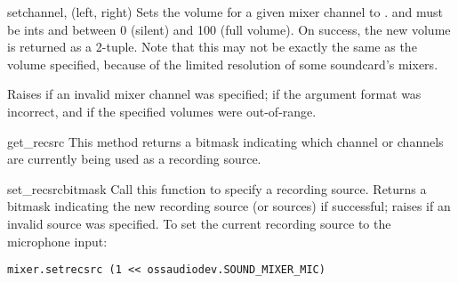 \begin{methoddesc}{set}{channel, (left, right)}
Sets the volume for a given mixer channel to .
 and  must be ints and between 0 (silent) and 100
(full volume).  On success, the new volume is returned as a 2-tuple.
Note that this may not be exactly the same as the volume specified,
because of the limited resolution of some soundcard's mixers.

Raises  if an invalid mixer channel was specified;
 if the argument format was incorrect, and
 if the specified volumes were out-of-range.
\end{methoddesc}

\begin{methoddesc}{get_recsrc}{}
This method returns a bitmask indicating which channel or channels are
currently being used as a recording source.
\end{methoddesc}

\begin{methoddesc}{set_recsrc}{bitmask}
Call this function to specify a recording source.  Returns a bitmask
indicating the new recording source (or sources) if successful; raises
 if an invalid source was specified.  To set the current
recording source to the microphone input:

\begin{verbatim}
mixer.setrecsrc (1 << ossaudiodev.SOUND_MIXER_MIC)
\end{verbatim}
\end{methoddesc}



